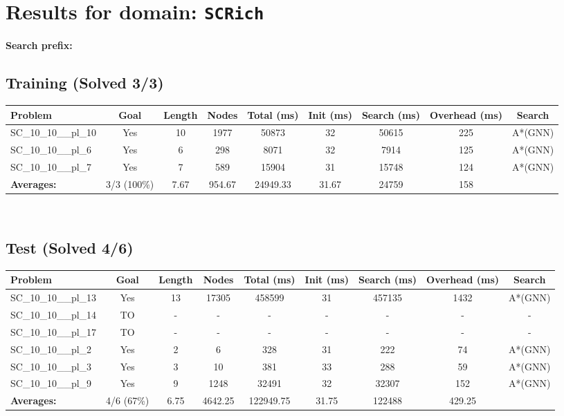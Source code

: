 \documentclass{article}
\begin{document}
\section*{Results for domain: \texttt{SCRich}}
\textbf{Search prefix:} 
\\[0.5cm]
\subsection*{Training (Solved 3/3)}
\begin{tabular}{lcccccccc}
\toprule
Problem & Goal & Length & Nodes & Total (ms) & Init (ms) & Search (ms) & Overhead (ms) & Search \\
\midrule
SC\_10\_10\_\_pl\_10 & Yes & 10 & 1977 & 50873 & 32 & 50615 & 225 & A*(GNN) \\
SC\_10\_10\_\_pl\_6 & Yes & 6 & 298 & 8071 & 32 & 7914 & 125 & A*(GNN) \\
SC\_10\_10\_\_pl\_7 & Yes & 7 & 589 & 15904 & 31 & 15748 & 124 & A*(GNN) \\
\textbf{Averages:} & 3/3 (100\%) & 7.67 & 954.67 & 24949.33 & 31.67 & 24759 & 158 & \\
\bottomrule
\end{tabular}
\\[0.7cm]
\subsection*{Test (Solved 4/6)}
\begin{tabular}{lcccccccc}
\toprule
Problem & Goal & Length & Nodes & Total (ms) & Init (ms) & Search (ms) & Overhead (ms) & Search \\
\midrule
SC\_10\_10\_\_pl\_13 & Yes & 13 & 17305 & 458599 & 31 & 457135 & 1432 & A*(GNN) \\
SC\_10\_10\_\_pl\_14 & TO & - & - & - & - & - & - & - \\
SC\_10\_10\_\_pl\_17 & TO & - & - & - & - & - & - & - \\
SC\_10\_10\_\_pl\_2 & Yes & 2 & 6 & 328 & 31 & 222 & 74 & A*(GNN) \\
SC\_10\_10\_\_pl\_3 & Yes & 3 & 10 & 381 & 33 & 288 & 59 & A*(GNN) \\
SC\_10\_10\_\_pl\_9 & Yes & 9 & 1248 & 32491 & 32 & 32307 & 152 & A*(GNN) \\
\textbf{Averages:} & 4/6 (67\%) & 6.75 & 4642.25 & 122949.75 & 31.75 & 122488 & 429.25 & \\
\bottomrule
\end{tabular}
\\[0.7cm]
\end{document}
